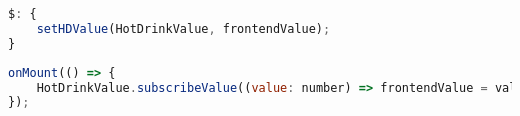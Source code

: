 \begin{lstlisting}[caption={Using the reactive statement, in Svelte~\cite{sveltedocs}, to update HotDrink corresopnding value, and trigger HotDrink to enforce the constraint system},label=reactiveStatement, language=javascript]
$: {
    setHDValue(HotDrinkValue, frontendValue);
}
\end{lstlisting}

\begin{lstlisting}[caption={Using the onMount callback, in Svelte~\cite{sveltedocs}, to update the frontend value that correspont to the same value in HotDrink, when the HotDrink value changes.},label=onMountHotdrink, language=javascript]
onMount(() => {
    HotDrinkValue.subscribeValue((value: number) => frontendValue = value);
});
\end{lstlisting}